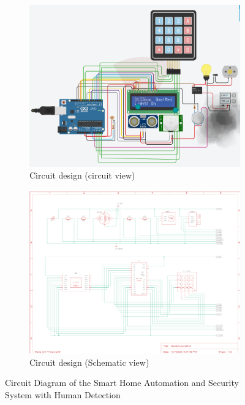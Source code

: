 \documentclass[a4paper,12pt]{article}
\begin{document}
\begin{figure}[H]
  \centering
  \begin{subfigure}{0.45\textwidth}
      \centering
      \includegraphics[width=\linewidth]{ultimate.png}
      \caption{Circuit design (circuit view)}
  \end{subfigure}
  \hfill
  \begin{subfigure}{0.45\textwidth}
      \centering
      \includegraphics[width=\linewidth]{co_1.png}
      \caption{Circuit design (Schematic view)}
  \end{subfigure}
  \caption{Circuit Diagram of the Smart Home Automation and Security System with Human Detection}
  \label{fig:home_automation_circuit}
\end{figure}
\end{document}

